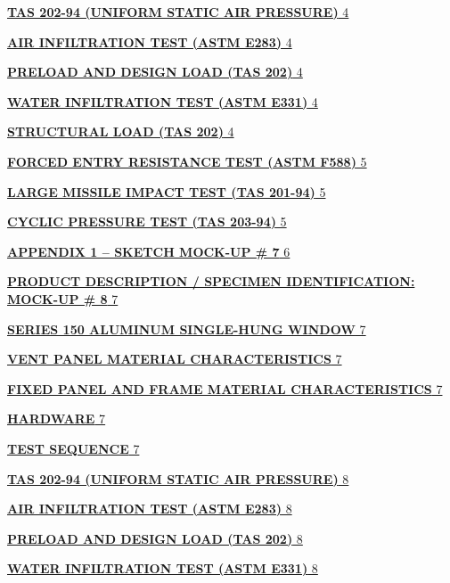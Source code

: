 \protect\hyperlink{tas-202-94-uniform-static-air-pressure}{\textbf{TAS
202-94 (UNIFORM STATIC AIR PRESSURE)} 4}

\protect\hyperlink{air-infiltration-test-astm-e283}{\textbf{AIR
INFILTRATION TEST (ASTM E283)} 4}

\protect\hyperlink{preload-and-design-load-tas-202}{\textbf{PRELOAD AND
DESIGN LOAD (TAS 202)} 4}

\protect\hyperlink{water-infiltration-test-astm-e331}{\textbf{WATER
INFILTRATION TEST (ASTM E331)} 4}

\protect\hyperlink{structural-load-tas-202}{\textbf{STRUCTURAL LOAD (TAS
202)} 4}

\protect\hyperlink{forced-entry-resistance-test-astm-f588}{\textbf{FORCED
ENTRY RESISTANCE TEST (ASTM F588)} 5}

\protect\hyperlink{large-missile-impact-test-tas-201-94}{\textbf{LARGE
MISSILE IMPACT TEST (TAS 201-94)} 5}

\protect\hyperlink{cyclic-pressure-test-tas-203-94}{\textbf{CYCLIC
PRESSURE TEST (TAS 203-94)} 5}

\protect\hyperlink{appendix-1-sketch-mock-up}{\textbf{APPENDIX 1 --
SKETCH MOCK-UP \# 7} 6}

\protect\hyperlink{product-description-specimen-identification-mock-up-1}{\textbf{PRODUCT
DESCRIPTION / SPECIMEN IDENTIFICATION: MOCK-UP \# 8} 7}

\protect\hyperlink{_Toc191563518}{\textbf{SERIES 150 ALUMINUM
SINGLE-HUNG WINDOW} 7}

\protect\hyperlink{vent-panel-material-characteristics-1}{\textbf{VENT
PANEL MATERIAL CHARACTERISTICS} 7}

\protect\hyperlink{fixed-panel-and-frame-material-characteristics-1}{\textbf{FIXED
PANEL AND FRAME MATERIAL CHARACTERISTICS} 7}

\protect\hyperlink{hardware-1}{\textbf{HARDWARE} 7}

\protect\hyperlink{test-sequence-1}{\textbf{TEST SEQUENCE} 7}

\protect\hyperlink{_Toc191563523}{\textbf{TAS 202-94 (UNIFORM STATIC AIR
PRESSURE)} 8}

\protect\hyperlink{air-infiltration-test-astm-e283-1}{\textbf{AIR
INFILTRATION TEST (ASTM E283)} 8}

\protect\hyperlink{preload-and-design-load-tas-202-1}{\textbf{PRELOAD
AND DESIGN LOAD (TAS 202)} 8}

\protect\hyperlink{water-infiltration-test-astm-e331-1}{\textbf{WATER
INFILTRATION TEST (ASTM E331)} 8}


